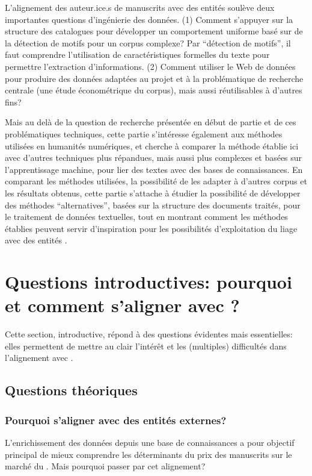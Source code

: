 L'alignement des auteur.ice.s de manuscrits avec des entités \wkd{} soulève deux importantes questions d'ingénierie des données. (1) Comment s'appuyer sur la structure des catalogues pour développer un comportement uniforme basé sur de la détection de motifs pour un corpus complexe? Par \enquote{détection de motifs}, il faut comprendre l'utilisation de caractéristiques formelles du texte pour permettre l'extraction d'informations. (2) Comment utiliser le Web de données pour produire des données adaptées au projet et à la problématique de recherche centrale (une étude économétrique du corpus), mais aussi réutilisables à d'autres fins?

Mais au delà de la question de recherche présentée en début de partie et de ces problématiques techniques, cette partie s'intéresse également aux méthodes utilisées en humanités numériques, et cherche à comparer la méthode établie ici avec d'autres techniques plus répandues, mais aussi plus complexes et basées sur l'apprentissage machine, pour lier des textes avec des bases de connaissances. En comparant les méthodes utilisées, la possibilité de les adapter à d'autres corpus et les résultats obtenus, cette partie s'attache à étudier la possibilité de développer des méthodes \enquote{alternatives}, basées sur la structure des documents traités, pour le traitement de données textuelles, tout en montrant comment les méthodes établies peuvent servir d'inspiration pour les possibilités d'exploitation du liage avec des entités \wkd{}.

\chapter{Questions introductives: pourquoi et comment s'aligner avec \wkd{} ?}
Cette section, introductive, répond à des questions évidentes mais essentielles: elles permettent de mettre au clair l'intérêt et les (multiples) difficultés dans l'alignement avec \wkd{}.

\section{Questions théoriques}
\subsection{Pourquoi s'aligner avec des entités externes?}
L'enrichissement des données depuis une base de connaissances a pour objectif principal de mieux comprendre les déterminants du prix des manuscrits sur le marché du . Mais pourquoi passer par cet alignement? 

